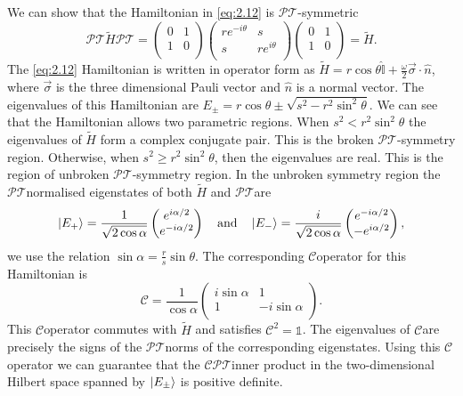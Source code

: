 \documentclass[12pt, a4paper]{report}
\newcommand\PT{\(\mathcal{PT}\)}
\newcommand\CC{\(\mathcal{C}\)}
\begin{document}
We can show that the Hamiltonian in \ref{eq:2.12} is \PT-symmetric
\begin{equation*}
\mathcal{PT}\tilde{H}\mathcal{PT} =\begin{pmatrix}
0 & 1  \\
1 & 0 \\
\end{pmatrix}
\begin{pmatrix}
re^{-i\theta} & s  \\
s & re^{i\theta} \\
\end{pmatrix}
\begin{pmatrix}
0 & 1  \\
1 & 0 \\
\end{pmatrix} = \tilde{H}.
\end{equation*}
The \ref{eq:2.12} Hamiltonian is written in operator form as $\tilde{H} = r\cos\theta \hat{\mathbb{I}} + \frac{\omega}{2} \vec{\sigma}\cdot\hat{n}$, where $\vec{\sigma}$ is the three dimensional Pauli vector and $\hat{n}$ is a normal vector. The eigenvalues of this Hamiltonian are $E_{\pm} = r\cos\theta \pm \sqrt{s^2 - r^2\sin^2\theta}$. We can see that the Hamiltonian allows two parametric regions. When $s^2 < r^2\sin^2\theta$ the eigenvalues of $\tilde{H}$ form a complex conjugate pair. This is the broken \PT-symmetry region. Otherwise, when $s^2 \geq r^2\sin^2\theta$, then the eigenvalues are real. This is the region of unbroken \PT-symmetry region. In the unbroken symmetry region the \PT\:normalised eigenstates of both $\tilde{H}$ and \PT\:are
\begin{equation}\label{eq:2.14}
\ket{E_{+}} = \frac{1}{\sqrt{2\cos\alpha}}\begin{pmatrix}
e^{i\alpha/2} \\
e^{-i\alpha/2} \\
\end{pmatrix}\quad\mathrm{and}\quad\ket{E_{-}} = \frac{i}{\sqrt{2\cos\alpha}}\begin{pmatrix}
e^{-i\alpha/2} \\
-e^{i\alpha/2} \\
\end{pmatrix},
\end{equation}
we use the relation $\sin\alpha = \frac{r}{s}\sin\theta$.
The corresponding \CC\:operator for this Hamiltonian is 
\begin{equation}\label{eq:2.15}
\mathcal{C} = \frac{1}{\cos\alpha}\begin{pmatrix}
i\sin\alpha & 1 \\
1 & -i\sin\alpha\\
\end{pmatrix}.
\end{equation}
This \CC\:operator commutes with $\tilde{H}$ and satisfies $\mathcal{C}^2= \mathds{1}$. The eigenvalues of \CC\:are precisely the signs of the \PT\:norms of the corresponding eigenstates\cite{Bender_2004}. Using this \CC\: operator we can guarantee that the \CC\PT\:inner product in the two-dimensional Hilbert space spanned by $\ket{E_{\pm}}$ is positive definite.
\end{document}
